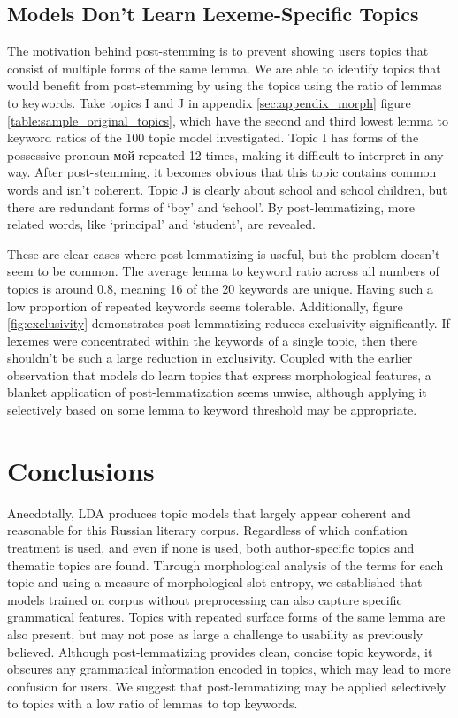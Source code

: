 \documentclass[11pt,a4paper]{article}
\begin{document}
\subsection{Models Don't Learn Lexeme-Specific Topics}
The motivation behind post-stemming is to prevent showing users topics that consist of multiple forms of the same lemma. We are able to identify topics that would benefit from post-stemming by using the topics using the ratio of lemmas to keywords. Take topics I and J in appendix \ref{sec:appendix_morph} figure \ref{table:sample_original_topics}, which have the second and third lowest lemma to keyword ratios of the 100 topic model investigated. Topic I has forms of the possessive pronoun \foreignlanguage{russian}{мой} repeated 12 times, making it difficult to interpret in any way. After post-stemming, it becomes obvious that this topic contains common words and isn't coherent. Topic J is clearly about school and school children, but there are redundant forms of `boy' and `school'. By post-lemmatizing, more related words, like `principal' and `student', are revealed.

These are clear cases where post-lemmatizing is useful, but the problem doesn't seem to be common. The average lemma to keyword ratio across all numbers of topics is around 0.8, meaning 16 of the 20 keywords are unique. Having such a low proportion of repeated keywords seems tolerable. Additionally, figure \ref{fig:exclusivity} demonstrates post-lemmatizing reduces exclusivity significantly. If lexemes were concentrated within the keywords of a single topic, then there shouldn't be such a large reduction in exclusivity. Coupled with the earlier observation that models do learn topics that express morphological features, a blanket application of post-lemmatization seems unwise, although applying it selectively based on some lemma to keyword threshold may be appropriate.

\section{Conclusions}
Anecdotally, LDA produces topic models that largely appear coherent and reasonable for this Russian literary corpus. Regardless of which conflation treatment is used, and even if none is used, both author-specific topics and thematic topics are found. Through morphological analysis of the terms for each topic and using a measure of morphological slot entropy, we established that models trained on corpus without preprocessing can also capture specific grammatical features. Topics with repeated surface forms of the same lemma are also present, but may not pose as large a challenge to usability as previously believed. Although post-lemmatizing provides clean, concise topic keywords, it obscures any grammatical information encoded in topics, which may lead to more confusion for users. We suggest that post-lemmatizing may be applied selectively to topics with a low ratio of lemmas to top keywords.
\end{document}
